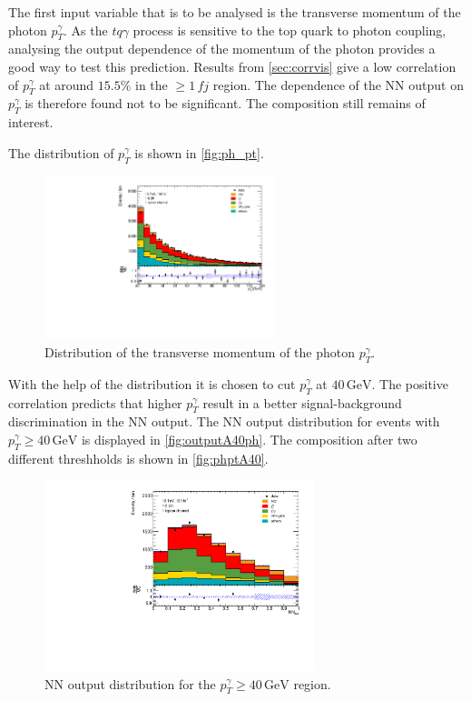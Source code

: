 The first input variable that is to be analysed is the transverse momentum of the photon $p_T^\gamma$. As the $tq\gamma$ process is sensitive to the top quark to photon coupling, analysing the output dependence of the momentum of the photon provides a good way to test this prediction. 
Results from \autoref{sec:corrvis} give a low correlation of $p_T^\gamma$ at around $15.5\%$ in the $\geq 1\, fj$ region. The dependence of the NN output on $p_T^\gamma$ is therefore found not to be significant. The composition still remains of interest. 

The distribution of $p_T^\gamma$ is shown in \autoref{fig:ph_pt}. 

\begin{figure}[htbp]
    \centering
    \includegraphics[width=0.6\textwidth]{Plots/ph_pt.pdf}
    \caption{Distribution of the transverse momentum of the photon $p_T^\gamma$.}
    \label{fig:ph_pt}
\end{figure}

With the help of the distribution it is chosen to cut $p_T^\gamma$ at $40\,\si{\giga\electronvolt}$. The positive correlation predicts that higher $p_T^\gamma$ result in a better signal-background discrimination in the NN output. 
The NN output distribution for events with $p_T^\gamma \geq 40\,\si{\giga\electronvolt}$ is displayed in \autoref{fig:outputA40ph}. The composition after two different threshholds is shown in \autoref{fig:phptA40}.

\begin{figure}
    \centering
    \includegraphics[width=0.7\textwidth]{Plots/NN_out_mixphA40.pdf}
    \caption{NN output distribution for the $p_T^\gamma \geq 40\,\si{\giga\electronvolt}$ region.}
    \label{fig:outputA40ph}
\end{figure} 

